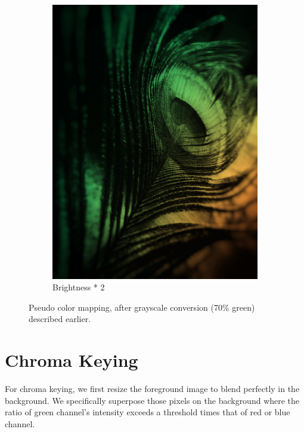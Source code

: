 \documentclass[a4paper]{article}
\begin{document}
\begin{figure}[H]
\begin{subfigure}[b]{.225\textwidth}
        \includegraphics[width=\textwidth]{output/feather_brightness_adjusted.jpg}
        \caption{Brightness * 2}
    \end{subfigure}
    \hfill
    \caption{Pseudo color mapping, after grayscale conversion (70\% green) described earlier.}
    \label{fig:pseudo_color}
\end{figure}

\section{Chroma Keying}

For chroma keying, we first resize the foreground image to blend perfectly in the background. We specifically superpose those pixels on the background where the ratio of green channel's intensity exceeds a threshold times that of red or blue channel.
\end{document}
